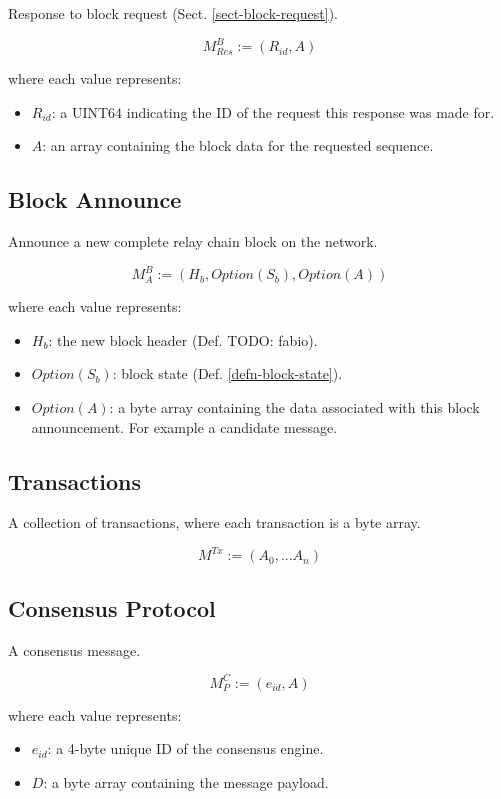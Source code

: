 \documentclass{book}
\newcommand{\todo}[1]{}
\renewcommand{\todo}[1]{{\color{red} TODO: {#1}}}
\begin{document}
Response to block request (Sect. \ref{sect-block-request}).

\[
    M^B_{Res} := (R_{id}, A)
\]

where each value represents:

\begin{itemize}
    \item $R_{id}$: a UINT64 indicating the ID of the request this response was
    made for.
    \item $A$: an array containing the block data for the requested
    sequence.
\end{itemize}

\subsection{Block Announce}

Announce a new complete relay chain block on the network.

\[
    M^B_A := (H_b, Option(S_b), Option(A))
\]

where each value represents:

\begin{itemize}
    \item $H_b$: the new block header (Def. \todo{fabio}).
    \item $Option(S_b)$: block state (Def. \ref{defn-block-state}).
    \item $Option(A)$: a byte array containing the data associated with this
    block announcement. For example a candidate message.
\end{itemize}

\subsection{Transactions}

A collection of transactions, where each transaction is a byte array.

\[
    M^{Tx} := (A_0, ... A_n)
\]

\subsection{Consensus Protocol}\label{sect-consensus-protocol}

A consensus message.

\[
    M^C_P := (e_{id}, A)
\]

where each value represents:

\begin{itemize}
    \item $e_{id}$: a 4-byte unique ID of the consensus engine.
    \item $D$: a byte array containing the message payload.
\end{itemize}
\end{document}
